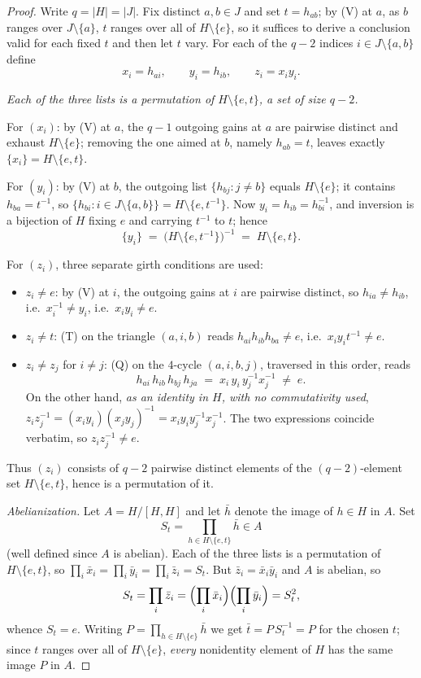 \documentclass[10pt]{article}
\newcommand{\id}{e}
\begin{document}
\begin{proof}
Write $q=|H|=|J|$.
Fix distinct $a,b\in J$ and set $t=h_{ab}$; by (V) at $a$, as $b$
ranges over $J \setminus \{a\}$, $t$ ranges over all of
$H\setminus\{\id\}$, so it suffices to derive a conclusion valid for
each fixed $t$ and then let $t$ vary. For each of the $q-2$ indices
$i\in J\setminus\{a,b\}$ define
\[
x_i=h_{ai},\qquad y_i=h_{ib},\qquad z_i=x_i y_i .
\]

\emph{Each of the three lists is a permutation of
$H\setminus\{\id,t\}$, a set of size $q-2$.}

For $(x_i)$: by (V) at $a$, the $q-1$ outgoing gains at $a$ are
pairwise distinct and exhaust $H\setminus\{\id\}$; removing the one
aimed at $b$, namely $h_{ab}=t$, leaves exactly
$\{x_i\}=H\setminus\{\id,t\}$.

For $(y_i)$: by (V) at $b$, the outgoing list
$\{h_{bj}:j\ne b\}$ equals $H\setminus\{\id\}$; it contains
$h_{ba}=t^{-1}$, so $\{h_{bi}: i\in J\setminus\{a,b\}\}
= H\setminus\{\id,t^{-1}\}$. Now $y_i=h_{ib}=h_{bi}^{-1}$, and
inversion is a bijection of $H$ fixing $\id$ and carrying $t^{-1}$ to
$t$; hence
\[
\{y_i\} \;=\;
\bigl(H\setminus\{\id,t^{-1}\}\bigr)^{-1}
\;=\; H\setminus\{\id,t\}.
\]

For $(z_i)$, three separate girth conditions are used:
\begin{itemize}
\item $z_i\neq\id$: by (V) at $i$, the outgoing gains at $i$ are
pairwise distinct, so $h_{ia}\neq h_{ib}$, i.e.\
$x_i^{-1}\neq y_i$, i.e.\ $x_iy_i\neq\id$.
\item $z_i\neq t$: (T) on the triangle $(a,i,b)$ reads
$h_{ai}h_{ib}h_{ba}\neq\id$, i.e.\ $x_iy_it^{-1}\neq\id$.
\item $z_i\neq z_j$ for $i\neq j$: (Q) on the $4$-cycle
$(a,i,b,j)$, traversed in this order, reads
\[
h_{ai}\,h_{ib}\,h_{bj}\,h_{ja}
\;=\;
x_i\, y_i\, y_j^{-1} x_j^{-1}\;\neq\;\id .
\]
On the other hand, \emph{as an identity in $H$, with no commutativity
used}, $z_iz_j^{-1}=(x_iy_i)(x_jy_j)^{-1}=x_iy_iy_j^{-1}x_j^{-1}$.
The two expressions coincide verbatim, so $z_iz_j^{-1}\neq\id$.
\end{itemize}
Thus $(z_i)$ consists of $q-2$ pairwise distinct elements of the
$(q-2)$-element set $H\setminus\{\id,t\}$, hence is a permutation
of it.

\emph{Abelianization.} Let $A=H/[H,H]$ and let
$\bar h$ denote the image of $h\in H$ in $A$. Set
\[
S_t=\prod_{h\in H\setminus\{\id,t\}}\bar h \in A
\]
(well defined since $A$ is abelian). Each of the three lists is a
permutation of $H\setminus\{\id,t\}$, so
$\prod_i\bar x_i=\prod_i\bar y_i=\prod_i\bar z_i=S_t$. But
$\bar z_i=\bar x_i\bar y_i$ and $A$ is abelian, so
\[
S_t=\prod_i\bar z_i
=\Bigl(\prod_i\bar x_i\Bigr)\Bigl(\prod_i\bar y_i\Bigr)=S_t^2,
\]
whence $S_t=\id$. Writing $P=\prod_{h\in H\setminus\{\id\}}\bar h$ we
get $\bar t=P\, S_t^{-1} = P$ for the chosen $t$; since $t$ ranges over all of
$H\setminus\{\id\}$, \emph{every} nonidentity element of $H$ has the
same image $P$ in $A$.


\end{proof}
\end{document}
